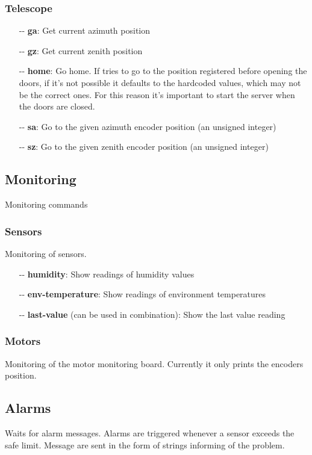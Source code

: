 \documentclass[letterpaper, 10 pt]{article}
\begin{document}
\subsubsection{Telescope}
\begin{itemize}
	\item[-{}-] \textbf{ga}: Get current azimuth position
	\item[-{}-] \textbf{gz}: Get current zenith position
	\item[-{}-] \textbf{home}: Go home. If tries to go to the position registered before opening the doors, if it's not possible it defaults to the hardcoded values, which may not be the correct ones. For this reason it's important to start the server when the doors are closed.
	\item[-{}-] \textbf{sa}: Go to the given azimuth encoder position (an unsigned integer)
	\item[-{}-] \textbf{sz}: Go to the given zenith encoder position (an unsigned integer)
\end{itemize}
\subsection{Monitoring}
Monitoring commands
\subsubsection{Sensors}
Monitoring of sensors. 
\begin{itemize}
	\item[-{}-] \textbf{humidity}: Show readings of humidity values 
	\item[-{}-] \textbf{env-temperature}: Show readings of environment temperatures
	\item[-{}-] \textbf{last-value} (can be used in combination): Show the last value reading
\end{itemize}
\subsubsection{Motors}
Monitoring of the motor monitoring board. Currently it only prints the encoders position.

\subsection{Alarms}
Waits for alarm messages. Alarms are triggered whenever a sensor exceeds the safe limit. Message are sent in the form of strings informing of the problem.
\end{document}
